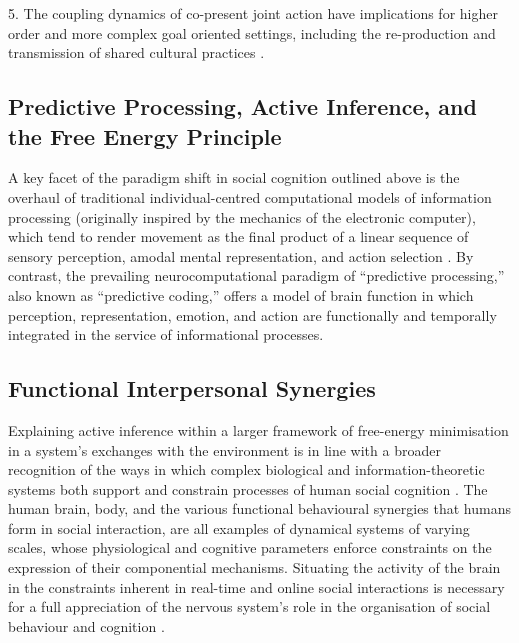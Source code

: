 \begin{CJK}{UTF8}{gbsn}
{5. The coupling dynamics of co-present joint action have implications for higher order and more complex goal oriented settings, including the re-production and transmission of shared cultural practices \citep{Dunbar2012,Roepstorff2010,Claidiere2014}.



\subsection{Predictive Processing, Active Inference, and the Free Energy Principle}
A key facet of the paradigm shift in social cognition outlined above is the overhaul of traditional individual-centred computational models of information processing (originally inspired by the mechanics of the electronic computer), which tend to render movement as the final product of a linear sequence of sensory perception, amodal mental representation, and action selection \citep{Lewis2005}.  By contrast, the prevailing neurocomputational paradigm of ``predictive processing,'' also known as ``predictive coding,'' \citep[see][]{Frith2007,Kilner2009,Clark2013} offers a model of brain function in which perception, representation, emotion, and action are functionally and temporally integrated in the service of informational processes.



\subsection{Functional Interpersonal Synergies}
Explaining active inference within a larger framework of free-energy minimisation in a system's exchanges with the environment is in line with a broader recognition of the ways in which complex biological and information-theoretic systems both support and constrain processes of human social cognition \citep{Dale2014}.  The human brain, body, and the various functional behavioural synergies that humans form in social interaction, are all examples of dynamical systems of varying scales, whose physiological and cognitive parameters enforce constraints on the expression of their componential mechanisms.  Situating the activity of the brain in the constraints inherent in real-time and online social interactions is necessary for a full appreciation of the nervous system's role in the organisation of social behaviour and cognition \citep{Coey2012}.

}
\end{CJK}
